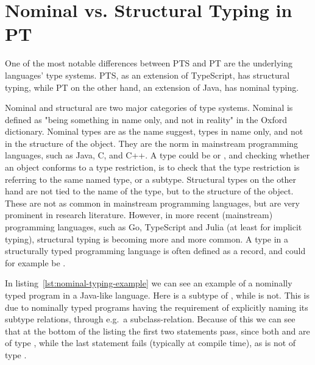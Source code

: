 
\section{Nominal vs. Structural Typing in PT}\label{sec:difference-between-pts-and-ptj}

One of the most notable differences between PTS and PT are the underlying languages' type systems.
PTS, as an extension of TypeScript, has structural typing, while PT on the other hand, an extension of Java, has nominal typing.

Nominal and structural are two major categories of type systems.
Nominal is defined as "being something in name only, and not in reality" in the Oxford dictionary.
Nominal types are as the name suggest, types in name only, and not in the structure of the object.
They are the norm in mainstream programming languages, such as Java, C, and C++.
A type could be  or , and checking whether an object conforms to a type restriction, is to check that the type restriction is referring to the same named type, or a subtype.
Structural types on the other hand are not tied to the name of the type, but to the structure of the object.
These are not as common in mainstream programming languages, but are very prominent in research literature.
However, in more recent (mainstream) programming languages, such as Go, TypeScript and Julia (at least for implicit typing), structural typing is becoming more and more common.
A type in a structurally typed programming language is often defined as a record, and could for example be .

In listing~\vref{lst:nominal-typing-example} we can see an example of a nominally typed program in a Java-like language.
Here  is a subtype of , while  is not.
This is due to nominally typed programs having the requirement of explicitly naming its subtype relations, through e.g.\ a subclass-relation.
Because of this we can see that at the bottom of the listing the first two statements pass, since both  and  are of type , while the last statement fails (typically at compile time), as  is not of type .

